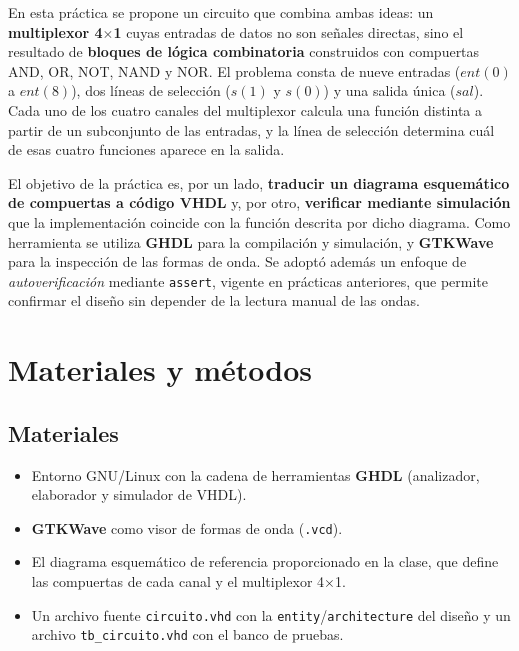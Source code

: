 \documentclass[12pt,a4paper]{article}
\begin{document}
En esta práctica se propone un circuito que combina ambas ideas: un
\textbf{multiplexor 4$\times$1} cuyas entradas de datos no son señales
directas, sino el resultado de \textbf{bloques de lógica combinatoria}
construidos con compuertas AND, OR, NOT, NAND y NOR. El problema consta de
nueve entradas ($ent(0)$ a $ent(8)$), dos líneas de selección ($s(1)$ y $s(0)$)
y una salida única ($sal$). Cada uno de los cuatro canales del multiplexor
calcula una función distinta a partir de un subconjunto de las entradas, y la
línea de selección determina cuál de esas cuatro funciones aparece en la
salida.

El objetivo de la práctica es, por un lado, \textbf{traducir un diagrama
esquemático de compuertas a código VHDL} y, por otro, \textbf{verificar
mediante simulación} que la implementación coincide con la función descrita por
dicho diagrama. Como herramienta se utiliza \textbf{GHDL} para la compilación y
simulación, y \textbf{GTKWave} para la inspección de las formas de onda. Se
adoptó además un enfoque de \emph{autoverificación} mediante \texttt{assert},
vigente en prácticas anteriores, que permite confirmar el diseño sin depender
de la lectura manual de las ondas.

\section{Materiales y métodos}

\subsection*{Materiales}

\begin{itemize}
    \item Entorno GNU/Linux con la cadena de herramientas \textbf{GHDL}
          (analizador, elaborador y simulador de VHDL).
    \item \textbf{GTKWave} como visor de formas de onda (\texttt{.vcd}).
    \item El diagrama esquemático de referencia proporcionado en la clase,
          que define las compuertas de cada canal y el multiplexor 4$\times$1.
    \item Un archivo fuente \texttt{circuito.vhd} con la
          \texttt{entity}/\texttt{architecture} del diseño y un archivo
          \texttt{tb\_circuito.vhd} con el banco de pruebas.
\end{itemize}
\end{document}

